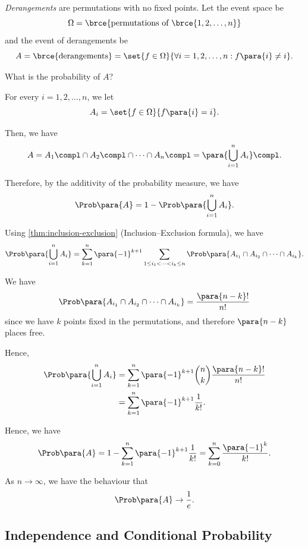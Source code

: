 \begin{example}[Derangements]
    \label{ex:derangements}%
    \emph{Derangements} are permutations with no fixed points. Let the event space be
    \[
        \Omega = \brce{\text{permutations of }\brce{1, 2, \ldots, n}}
    \]
    and the event of derangements be
    \[
        A = \brce{\text{derangements}} = \set{f \in \Omega}{\forall i = 1, 2, \ldots, n: f\para{i} \neq i}.
    \]

    What is the probability of \(A\)?

    For every \(i = 1, 2, \ldots, n\), we let
    \[
        A_i = \set{f \in \Omega}{f\para{i} = i}.
    \]

    Then, we have
    \[
        A = A_1\compl \cap A_2\compl \cap \cdots \cap A_n\compl = \para{\bigcup_{i = 1}^{n} A_i} \compl.
    \]

    Therefore, by the additivity of the probability measure, we have
    \[
        \Prob\para{A} = 1 - \Prob\para{\bigcup_{i = 1}^{n} A_i}.
    \]

    Using \autoref{thm:inclusion-exclusion} (Inclusion--Exclusion formula), we have
    \[
        \Prob\para{\bigcup_{i = 1}^{n} A_i} = \sum_{k = 1}^{n} \para{-1}^{k + 1} \sum_{1 \leq i_1 < \cdots < i_k \leq n} \Prob\para{A_{i_1} \cap A_{i_2} \cap \cdots \cap A_{i_k}}.
    \]

    We have
    \[
        \Prob\para{A_{i_1} \cap A_{i_2} \cap \cdots \cap A_{i_k}} = \frac{\para{n - k}!}{n!}
    \]
    since we have \(k\) points fixed in the permutations, and therefore \(\para{n - k}\) places free.
    
    Hence,
    \begin{align*}
        \Prob\para{\bigcup_{i = 1}^{n} A_i} &= \sum_{k = 1}^{n} \para{-1}^{k + 1} \binom{n}{k} \frac{\para{n - k}!}{n!} \\
        &= \sum_{k = 1}^{n} \para{-1}^{k + 1} \frac{1}{k!}.
    \end{align*}

    Hence, we have
    \[
        \Prob\para{A} = 1 - \sum_{k = 1}^{n} \para{-1}^{k + 1} \frac{1}{k!} = \sum_{k = 0}^{n} \frac{\para{-1}^{k}}{k!}.
    \]

    As \(n \to \infty\), we have the behaviour that
    \[
        \Prob\para{A} \to \frac{1}{e}.
    \]
\end{example}

\subsection{Independence and Conditional Probability}

